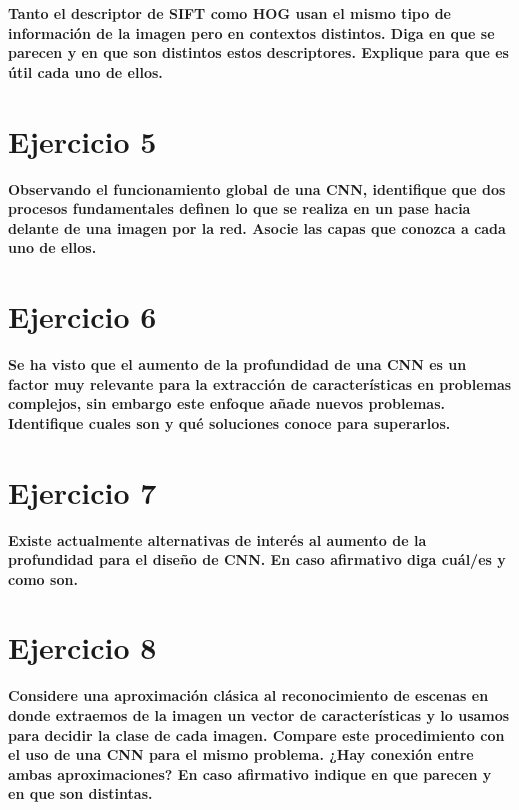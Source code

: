 \documentclass[11pt,a4paper]{article}
\begin{document}
\textbf{Tanto el descriptor de SIFT como HOG usan el mismo tipo de información de la imagen pero en contextos distintos. Diga en que se parecen y en que son
distintos estos descriptores. Explique para que es útil cada uno de ellos.}



\section*{Ejercicio 5}

\textbf{Observando el funcionamiento global de una CNN, identifique que dos procesos fundamentales definen lo que se realiza en un pase hacia delante de una
imagen por la red. Asocie las capas que conozca a cada uno de ellos.}



\section*{Ejercicio 6}

\textbf{Se ha visto que el aumento de la profundidad de una CNN es un factor muy relevante para la extracción de características en problemas complejos, sin
embargo este enfoque añade nuevos problemas. Identifique cuales son y qué soluciones conoce para superarlos.}



\section*{Ejercicio 7}

\textbf{Existe actualmente alternativas de interés al aumento de la profundidad para el diseño de CNN. En caso afirmativo diga cuál/es y como son.}




\section*{Ejercicio 8}

\textbf{Considere una aproximación clásica al reconocimiento de escenas en donde extraemos de la imagen un vector de características y lo usamos para decidir la
clase de cada imagen. Compare este procedimiento con el uso de una CNN para el mismo problema. ¿Hay conexión entre ambas aproximaciones? En caso afirmativo indique
en que parecen y en que son distintas.}
\end{document}
